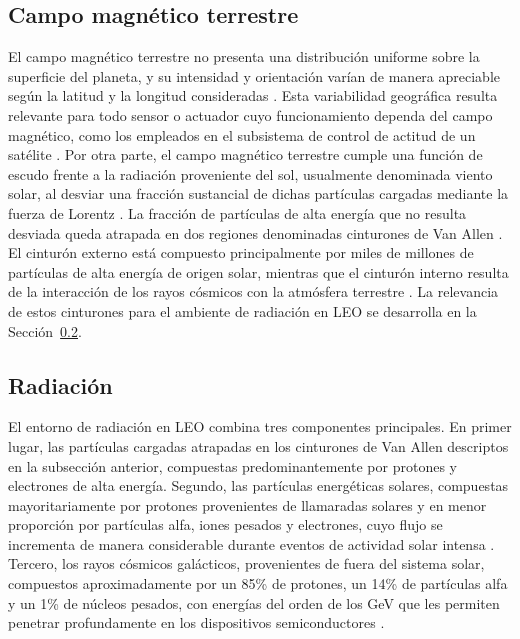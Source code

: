 \subsection{Campo magnético terrestre}
El campo magnético terrestre no presenta una distribución uniforme sobre la superficie del planeta, y su intensidad y orientación varían de manera apreciable según la latitud y la longitud consideradas \cite{esa2020}. Esta variabilidad geográfica resulta relevante para todo sensor o actuador cuyo funcionamiento dependa del campo magnético, como los empleados en el subsistema de control de actitud de un satélite \cite{miranda2012}. Por otra parte, el campo magnético terrestre cumple una función de escudo frente a la radiación proveniente del sol, usualmente denominada viento solar, al desviar una fracción sustancial de dichas partículas cargadas mediante la fuerza de Lorentz \cite{nasa2025magnet, epa2025}. La fracción de partículas de alta energía que no resulta desviada queda atrapada en dos regiones denominadas cinturones de Van Allen \cite{nasa2025vanallen}. El cinturón externo está compuesto principalmente por miles de millones de partículas de alta energía de origen solar, mientras que el cinturón interno resulta de la interacción de los rayos cósmicos con la atmósfera terrestre \cite{nasa2025vanallen}. La relevancia de estos cinturones para el ambiente de radiación en LEO se desarrolla en la Sección~\ref{sec:radiacion_leo}.

\subsection{Radiación} \label{sec:radiacion_leo}
El entorno de radiación en LEO combina tres componentes principales. En primer lugar, las partículas cargadas atrapadas en los cinturones de Van Allen descriptos en la subsección anterior, compuestas predominantemente por protones y electrones de alta energía. Segundo, las partículas energéticas solares, compuestas mayoritariamente por protones provenientes de llamaradas solares y en menor proporción por partículas alfa, iones pesados y electrones, cuyo flujo se incrementa de manera considerable durante eventos de actividad solar intensa \cite{mikaelian2001}. Tercero, los rayos cósmicos galácticos, provenientes de fuera del sistema solar, compuestos aproximadamente por un 85\% de protones, un 14\% de partículas alfa y un 1\% de núcleos pesados, con energías del orden de los GeV que les permiten penetrar profundamente en los dispositivos semiconductores \cite{mikaelian2001}.
 
